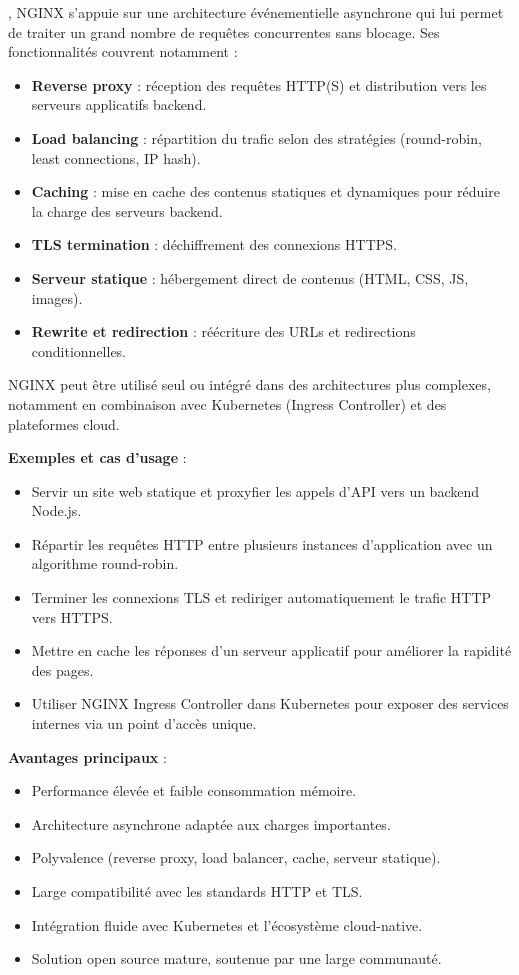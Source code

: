 , NGINX s’appuie sur une architecture événementielle asynchrone qui lui permet de traiter un grand nombre de requêtes concurrentes sans blocage. Ses fonctionnalités couvrent notamment  :
\begin{itemize}
	\item \textbf{Reverse proxy}  : réception des requêtes HTTP(S) et distribution vers les serveurs applicatifs backend.
	\item \textbf{Load balancing}  : répartition du trafic selon des stratégies (round-robin, least connections, IP hash).
	\item \textbf{Caching}  : mise en cache des contenus statiques et dynamiques pour réduire la charge des serveurs backend.
	\item \textbf{TLS termination}  : déchiffrement des connexions HTTPS.
	\item \textbf{Serveur statique}  : hébergement direct de contenus (HTML, CSS, JS, images).
	\item \textbf{Rewrite et redirection}  : réécriture des URLs et redirections conditionnelles.
\end{itemize}

NGINX peut être utilisé seul ou intégré dans des architectures plus complexes, notamment en combinaison avec Kubernetes (Ingress Controller) et des plateformes cloud.

\textbf{Exemples et cas d’usage} :
\begin{itemize}
	\item Servir un site web statique et proxyfier les appels d’API vers un backend Node.js.
	\item Répartir les requêtes HTTP entre plusieurs instances d’application avec un algorithme round-robin.
	\item Terminer les connexions TLS et rediriger automatiquement le trafic HTTP vers HTTPS.
	\item Mettre en cache les réponses d’un serveur applicatif pour améliorer la rapidité des pages.
	\item Utiliser NGINX Ingress Controller dans Kubernetes pour exposer des services internes via un point d’accès unique.
\end{itemize}

\textbf{Avantages principaux} :
\begin{itemize}
	\item Performance élevée et faible consommation mémoire.
	\item Architecture asynchrone adaptée aux charges importantes.
	\item Polyvalence (reverse proxy, load balancer, cache, serveur statique).
	\item Large compatibilité avec les standards HTTP et TLS.
	\item Intégration fluide avec Kubernetes et l’écosystème cloud-native.
	\item Solution open source mature, soutenue par une large communauté.
\end{itemize}

